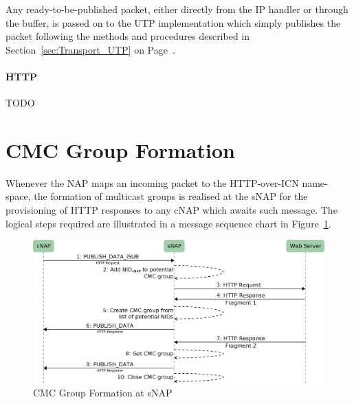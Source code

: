 \documentclass[a4paper,11pt,titlepage]{report}
\begin{document}
Any ready-to-be-published packet, either directly from the IP handler or through the buffer, is passed on to the \ac{UTP} implementation which simply publishes the packet following the methods and procedures described in Section~\ref{sec:Transport_UTP} on Page~\pageref{sec:Transport_UTP}.

\paragraph{HTTP}
TODO
\section{\acl{CMC} Group Formation}
Whenever the NAP maps an incoming packet to the HTTP-over-ICN name-space, the formation of multicast groups is realised at the \ac{sNAP} for the provisioning of HTTP responses to any \ac{cNAP} which awaits such message. The logical steps required are illustrated in a message sequence chart in Figure~\ref{fig:CmcGroupManagement}.

\begin{figure}
  \begin{center}
    \includegraphics[width=\textwidth]{eps/cmcGroupManagement.eps}
    \caption{\acl{CMC} Group Formation at \acl{sNAP}}
    \label{fig:CmcGroupManagement}
  \end{center}
\end{figure}
\end{document}
